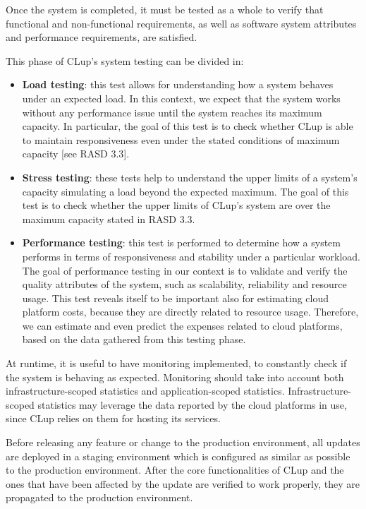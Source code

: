 \documentclass[../../main.tex]{subfiles}
\begin{document}
Once the system is completed, it must be tested as a whole to verify that functional and non-functional requirements, as well as software system attributes and performance requirements, are satisfied.

This phase of CLup's system testing can be divided in:


\begin{itemize}

	\item \textbf{Load testing}: this test allows for understanding how a system behaves under an expected load. 
	In this context, we expect that the system works without any performance issue until the system reaches its maximum capacity. 
	In particular, the goal of this test is to check whether CLup is able to maintain responsiveness even under the stated conditions of maximum capacity [see RASD 3.3].

	\item \textbf{Stress testing}: these tests help to understand the upper limits of a system's capacity simulating a load beyond the expected maximum. 
	The goal of this test is to check whether the upper limits of CLup's system are over the maximum capacity stated in RASD 3.3.

	\item \textbf{Performance testing}: this test is performed to determine how a system performs in terms of responsiveness and stability under a particular workload. 
	The goal of performance testing in our context is to validate and verify the quality attributes of the system, such as scalability, reliability and resource usage. 
	This test reveals itself to be important also for estimating cloud platform costs, because they are directly related to resource usage. 
	Therefore, we can estimate and even predict the expenses related to cloud platforms, based on the data gathered from this testing phase. 

\end{itemize} 

At runtime, it is useful to have monitoring implemented, to constantly check if the system is behaving as expected. 
Monitoring should take into account both infrastructure-scoped statistics and application-scoped statistics. Infrastructure-scoped statistics may leverage the data reported by the cloud platforms in use, since CLup relies on them for hosting its services.

Before releasing any feature or change to the production environment, all updates are deployed in a staging environment which is configured as similar as possible to the production environment. After the core functionalities of CLup and the ones that have been affected by the update are verified to work properly, they are propagated to the production environment.
\end{document}
